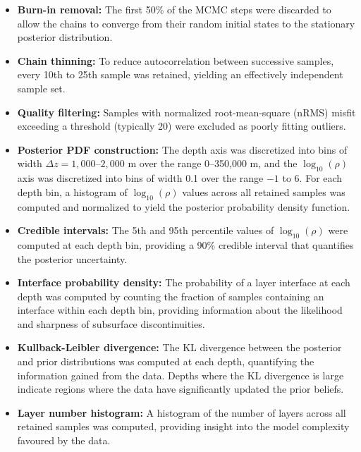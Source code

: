\begin{itemize}
    \item \textbf{Burn-in removal:} The first 50\% of the MCMC steps were discarded to allow the chains to converge from their random initial states to the stationary posterior distribution.

    \item \textbf{Chain thinning:} To reduce autocorrelation between successive samples, every 10th to 25th sample was retained, yielding an effectively independent sample set.

    \item \textbf{Quality filtering:} Samples with normalized root-mean-square (nRMS) misfit exceeding a threshold (typically 20) were excluded as poorly fitting outliers.

    \item \textbf{Posterior PDF construction:} The depth axis was discretized into bins of width $\Delta z = 1{,}000$--$2{,}000$ m over the range 0--350{,}000 m, and the $\log_{10}(\rho)$ axis was discretized into bins of width 0.1 over the range $-1$ to 6. For each depth bin, a histogram of $\log_{10}(\rho)$ values across all retained samples was computed and normalized to yield the posterior probability density function.

    \item \textbf{Credible intervals:} The 5th and 95th percentile values of $\log_{10}(\rho)$ were computed at each depth bin, providing a 90\% credible interval that quantifies the posterior uncertainty.

    \item \textbf{Interface probability density:} The probability of a layer interface at each depth was computed by counting the fraction of samples containing an interface within each depth bin, providing information about the likelihood and sharpness of subsurface discontinuities.

    \item \textbf{Kullback-Leibler divergence:} The KL divergence between the posterior and prior distributions was computed at each depth, quantifying the information gained from the data. Depths where the KL divergence is large indicate regions where the data have significantly updated the prior beliefs.

    \item \textbf{Layer number histogram:} A histogram of the number of layers across all retained samples was computed, providing insight into the model complexity favoured by the data.
\end{itemize}

